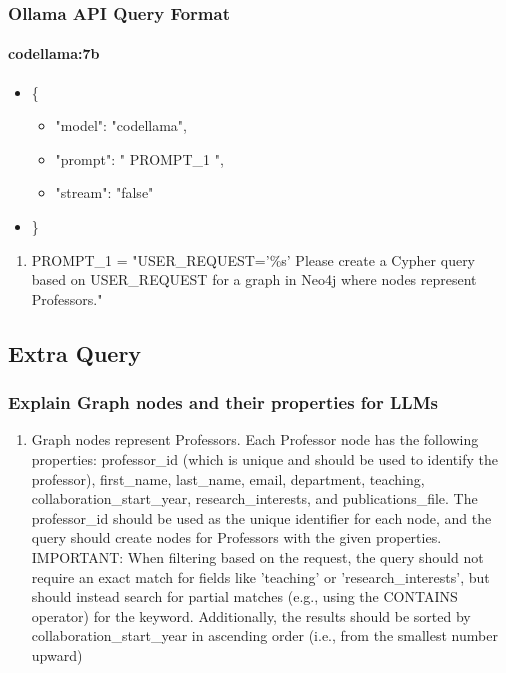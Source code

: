 \documentclass[
	11pt, %
]{beamer}
\begin{document}
\begin{frame}
	\frametitle{Ollama API Query Format}
	\framesubtitle{codellama:7b} %
	
	\begin{itemize}
		\item \{
		\begin{itemize}
			\item "model": "codellama",
			\item "prompt": " PROMPT\_1 ",
			\item  "stream": "false"
		\end{itemize}
		\item \}
	\end{itemize}
	
	\bigskip %
	
	\begin{enumerate}
		\item PROMPT\_1 = "USER\_REQUEST='\%s'   Please create a Cypher query based on USER\_REQUEST for a graph in Neo4j where nodes represent Professors."
	\end{enumerate}
\end{frame}


\subsection{Extra Query}

\begin{frame}
	\frametitle{Explain Graph nodes and their properties for LLMs}
		
	\begin{enumerate}
		\item Graph nodes represent Professors. Each Professor node has the following properties: professor\_id (which is unique and should be used to identify the professor), first\_name, last\_name, email, department, teaching, collaboration\_start\_year, research\_interests, and publications\_file. The professor\_id should be used as the unique identifier for each node, and the query should create nodes for Professors with the given properties.
	IMPORTANT: When filtering based on the request, the query should not require an exact match for fields like 'teaching' or 'research\_interests', but should instead search for partial matches (e.g., using the CONTAINS operator) for the keyword. Additionally, the results should be sorted by collaboration\_start\_year in ascending order (i.e., from the smallest number upward)
	\end{enumerate}
\end{frame}
\end{document}
